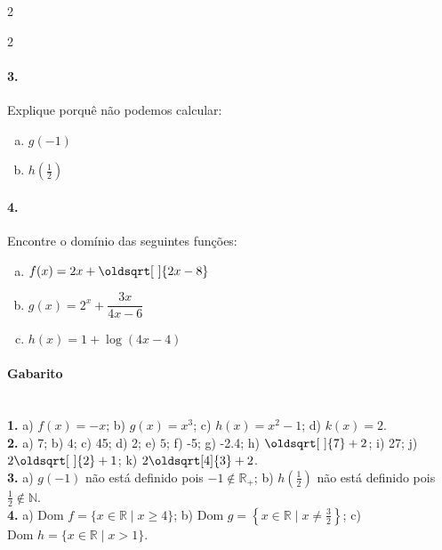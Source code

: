 \documentclass[a4paper,12pt]{article}
\renewcommand*{\sqrt}[2][\ ]{\oldsqrt[#1]{#2}}
\begin{document}
\begin{multicols}{2}
\begin{multicols*}{2}
\end{multicols*}
 
\paragraph*{3.} Explique porquê não podemos calcular: 
    \begin{enumerate}[a)]
        \item $g(-1)$
        \item $h\left(\frac{1}{2}\right) $
    \end{enumerate}
    
    
    
    \paragraph*{4.} Encontre o domínio das seguintes funções:
    \begin{enumerate}[a)]
        \item $f(x) = 2x + \sqrt{2x - 8}$
        \item $g(x) =2^x + \dfrac{3x}{4x-6}$
        \item $h(x) = 1+\log(4x - 4)$ 
    \end{enumerate}
    
\end{multicols}

\vspace*{\fill}
{\footnotesize
\paragraph*{Gabarito} \color{darkgray} \hspace*{\fill}\\
\textbf{1.} a) $f(x) = -x$; b) $g(x) = x^3$; c) $h(x) = x^2 - 1$; d) $k(x) = 2$.\\
\textbf{2.} a) 7; b) $4$; c) 45; d) 2; e) $5$; f) -5; g) -2.4; h) $\sqrt{7} + 2$; i) 27; j) $2\sqrt{2} + 1$; k) $2\sqrt[4]{3} + 2$.\\
\textbf{3.} a) $g(-1)$ não está definido pois $-1 \notin \mathbb{R}_{+}$; b) $h\left(\frac{1}{2}\right)$ não está definido pois $\frac{1}{2} \notin \mathbb{N}$.\\
\textbf{4.} a) $\text{Dom } f  = \{x\in\mathbb{R} \mid x\ge 4\}$; b)  $\text{Dom } g  = \left\{x\in\mathbb{R} \mid x \neq \tfrac{3}{2}\right\} $; c)  $\text{Dom } h  = \{x\in\mathbb{R} \mid x > 1\}$.  

}
\end{document}
